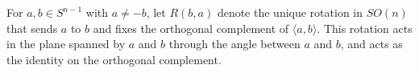 For $a, b \in S^{n-1}$ with $a \neq -b$, let $R(b, a)$ denote the unique rotation in $SO(n)$ that sends $a$ to $b$ and fixes the orthogonal complement of $\langle a, b \rangle$. This rotation acts in the plane spanned by $a$ and $b$ through the angle between $a$ and $b$, and acts as the identity on the orthogonal complement.
